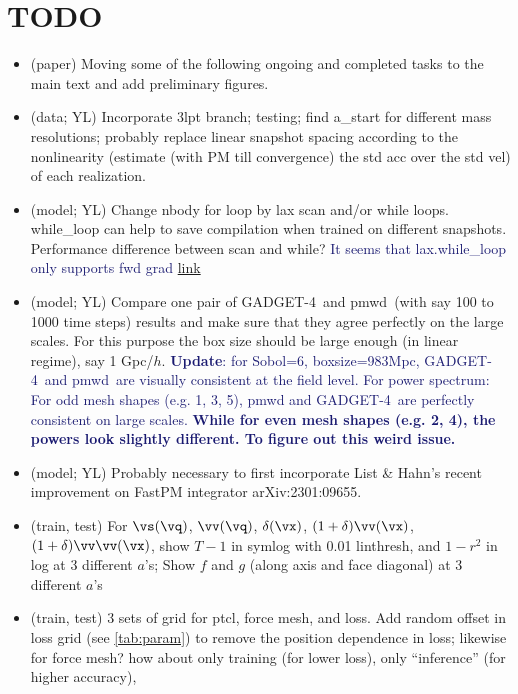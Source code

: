 \documentclass[modern, trackchanges, dvipsnames]{aastex631}
\newcommand{\pmwd}{{\usefont{T1}{nova}{m}{sl}pmwd}}
\newcommand{\GADGET}{{{\fontsize{10pt}{12pt}\selectfont GADGET}-4}}
\newcommand{\YZ}[1]{\textcolor{MidnightBlue}{#1}}
\begin{document}
\section*{TODO}
\begin{itemize}
\item (paper) Moving some of the following ongoing and completed tasks
  to the main text and add preliminary figures.
\item (data; YL) Incorporate 3lpt branch; testing; find a\_start for
  different mass resolutions; probably replace linear snapshot spacing
  according to the nonlinearity (estimate (with PM till convergence) the
  std acc over the std vel) of each realization.
\item (model; YL) Change nbody for loop by lax scan and/or while loops.
  while\_loop can help to save compilation when trained on different
  snapshots. Performance difference between scan and while?\newline
  \YZ{It seems that lax.while\_loop only supports fwd grad}
  \href{https://jax.readthedocs.io/en/latest/notebooks/Common_Gotchas_in_JAX.html#summary}{link}
\item (model; YL) Compare one pair of \GADGET\ and \pmwd\ (with say 100 to 1000 time
    steps) results and make sure that they agree perfectly on the large
    scales. For this purpose the box size should be large enough (in
    linear regime), say 1 Gpc/$h$.\newline
    \YZ{\textbf{Update}: for Sobol=6, boxsize=983Mpc, \GADGET\ and \pmwd\ are
    visually consistent at the field level. For power spectrum: For
    odd mesh shapes (e.g. 1, 3, 5), pmwd and \GADGET\ are perfectly consistent
    on large scales. \textbf{While for even mesh shapes (e.g. 2, 4), the powers
    look slightly different. To figure out this weird issue.}}
\item (model; YL) Probably necessary to first incorporate List \& Hahn's
  recent improvement on FastPM integrator arXiv:2301:09655.
\item (train, test) For $\vs(\vq)$, $\vv(\vq)$, $\delta(\vx)$,
  $(1+\delta)\vv(\vx)$, $(1+\delta)\vv\vv(\vx)$, show $T - 1$ in symlog
  with 0.01 linthresh, and $1-r^2$ in log at 3 different $a$'s; Show $f$
  and $g$ (along axis and face diagonal) at 3 different $a$'s
\item (train, test) 3 sets of grid for ptcl, force mesh, and loss. Add
  random offset in loss grid (see \autoref{tab:param}) to remove the
  position dependence in loss; likewise for force mesh? how about only
  training (for lower loss), only ``inference'' (for higher accuracy),

\end{itemize}
\end{document}
